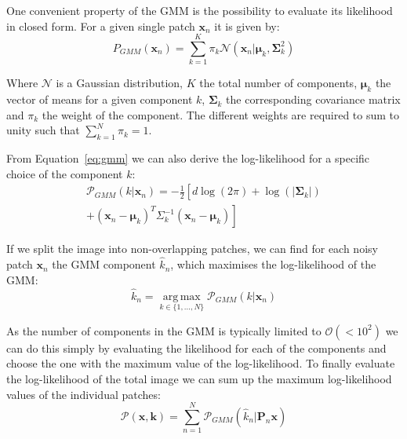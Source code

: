 \documentclass[twocolumn]{aastex631}
\DeclareMathOperator*{\argmax}{arg\,max}
\begin{document}
    One convenient property of the GMM is the possibility to evaluate its likelihood in closed form. For a given single patch $\mathbf{x}_n$ it is given by:
    \begin{equation}
        \label{eq:gmm}
        P_{GMM}(\mathbf{x}_n) = \sum_{k=1}^K \pi_k \mathcal{N}(\mathbf{x}_n| \boldsymbol{\mu}_k, \boldsymbol{\Sigma}_k^2)
    \end{equation}

    Where $\mathcal{N}$ is a Gaussian distribution, $K$ the total number of components, $\boldsymbol{\mu}_k$ the vector of means for a given component $k$, $\boldsymbol{\Sigma}_k$ the corresponding covariance matrix and $\pi_k$ the weight of the component. The different weights are required to sum to unity such that $\sum_{k=1}^N\pi_k = 1$. 

    From Equation~\ref{eq:gmm} we can also derive the log-likelihood for a specific choice of the component $k$:
    \begin{equation}
    \begin{split}
    \mathcal{P}_{GMM}(k| \mathbf{x}_n) = -\frac{1}{2} \left[ \right. d \log(2\pi)
    + \log(|\boldsymbol \Sigma_{k}|)\\
    + (\mathbf{x}_n - \boldsymbol{\mu}_{k})^T \Sigma^{-1}_{k}(\mathbf{x}_n - \boldsymbol{\mu}_{k}) \left. \right]
    \end{split}
    \end{equation}

    If we split the image into non-overlapping patches, we can find for each noisy patch $\mathbf{x}_n$ the GMM component $\hat{k}_n$, which maximises the log-likelihood of the GMM:
    \begin{equation}
        \hat{k}_n = \underset{k \in \{1, ..., N\} }{\argmax}{\mathcal{P}_{GMM}(k| \mathbf{x}_n)}
    \end{equation}
    \vspace{0.2em}

    As the number of components in the GMM is typically limited to $\mathcal{O}(<10^2)$ we can do this simply by evaluating the likelihood for each of the components and choose the one with the maximum value of the log-likelihood. To finally evaluate the log-likelihood of the total image we can sum up the maximum log-likelihood values of the individual patches: 
    \begin{equation}
        \label{eq:prior-total}
        \mathcal{P}(\mathbf{x}, \mathbf{k}) = \sum_{n = 1}^N \mathcal{P}_{GMM}(\hat{k}_n | \mathbf{P}_n \mathbf{x})
    \end{equation}
\end{document}
